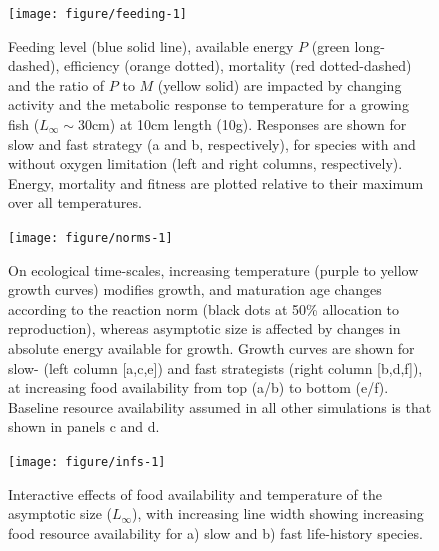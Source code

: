 \documentclass[11pt]{article}\usepackage[]{graphicx}\usepackage[]{color,soul}
\begin{document}
\begin{figure}[!ht]
{\centering 
\texttt{[image: figure/feeding-1]} 
}
\caption[Feeding level (blue solid line), available energy $P$ (green long-dashed), efficiency (orange dotted), mortality (red dotted-dashed) and the ratio of $P$ to $M$ (yellow solid) are impacted by changing activity and the metabolic response to temperature for a growing fish ($L_{\infty}\sim 30$cm) at 10cm length (10g)]{Feeding level (blue solid line), available energy $P$ (green long-dashed), efficiency (orange dotted), mortality (red dotted-dashed) and the ratio of $P$ to $M$ (yellow solid) are impacted by changing activity and the metabolic response to temperature for a growing fish ($L_{\infty}\sim 30$cm) at 10cm length (10g). Responses are shown for slow  and fast strategy (a and b, respectively), for species with and without oxygen limitation (left and right columns, respectively). Energy, mortality and fitness are plotted relative to their maximum over all temperatures.}\label{fig:feeding}
\end{figure}

\begin{figure}[!ht]
{\centering 
\texttt{[image: figure/norms-1]} 
}
\caption[On ecological time-scales, increasing temperature (purple to yellow growth curves) modifies growth, and maturation age changes according to the reaction norm (black dots at 50\% allocation to reproduction), whereas asymptotic size is affected by changes in absolute energy available for growth]{On ecological time-scales, increasing temperature (purple to yellow growth curves) modifies growth, and maturation age changes according to the reaction norm (black dots at 50\% allocation to reproduction), whereas asymptotic size is affected by changes in absolute energy available for growth. Growth curves are shown for slow- (left column [a,c,e]) and fast strategists (right column [b,d,f]), at increasing food availability from top (a/b) to bottom (e/f). Baseline resource availability assumed in all other simulations is that shown in panels c and d.}\label{fig:norms}
\end{figure}

\begin{figure}[!ht]
{\centering 
\texttt{[image: figure/infs-1]} 
}
\caption[Interactive effects of food availability and temperature on the asymptotic size ($L_{\infty}$), with increasing line width showing increasing food resource availability for a) slow and b) fast life-history species]{Interactive effects of food availability and temperature of the asymptotic size ($L_{\infty}$), with increasing line width showing increasing food resource availability for a) slow and b) fast life-history species.}\label{fig:infs}
\end{figure}
\end{document}
